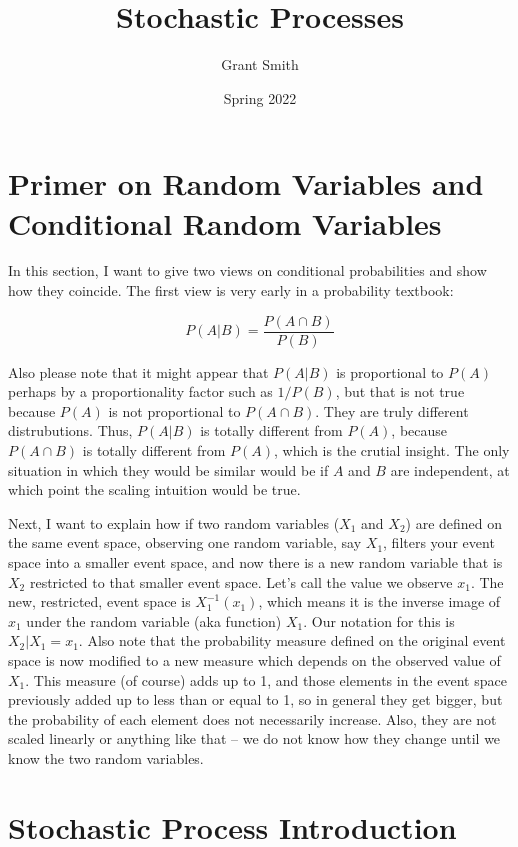 \documentclass{article}
\title{Stochastic Processes}
\author{Grant Smith }
\date{Spring 2022}
\begin{document}
\maketitle

\section{Primer on Random Variables and Conditional Random Variables}

In this section, I want to give two views on conditional probabilities and show how they coincide. The first view is very early in a probability textbook:

$$P(A|B) = \frac{P(A \cap  B)}{P(B)}$$

Also please note that it might appear that $P(A|B)$ is proportional to $P(A)$ perhaps by a proportionality factor such as $1/P(B)$, but that is not true because $P(A)$ is not proportional to $P(A \cap  B)$.  They are truly different distrubutions.  Thus, $P(A|B)$ is totally different from $P(A)$, because $P(A \cap  B)$ is totally different from $P(A)$, which is the crutial insight.  The only situation in which they would be similar would be if $A$ and $B$ are independent, at which point the scaling intuition would be true. 

Next, I want to explain how if two random variables ($X_1$ and $X_2$) are defined on the same event space, observing one random variable, say $X_1$, filters your event space into a smaller event space, and now there is a new random variable that is $X_2$ restricted to that smaller event space. Let's call the value we observe $x_1$.  The new, restricted, event space is $X_1^{-1}(x_1)$, which means it is the inverse image of $x_1$ under the random variable (aka function) $X_1$.  Our notation for this is $X_2 | X_1 = x_1$. Also note that the probability measure defined on the original event space is now modified to a new measure which depends on the observed value of $X_1$.  This measure (of course) adds up to 1, and those elements in the event space previously added up to less than or equal to 1, so in general they get bigger, but the probability of each element does not necessarily increase.  Also, they are not scaled linearly or anything like that -- we do not know how they change until we know the two random variables.

\section{Stochastic Process Introduction}
\end{document}
